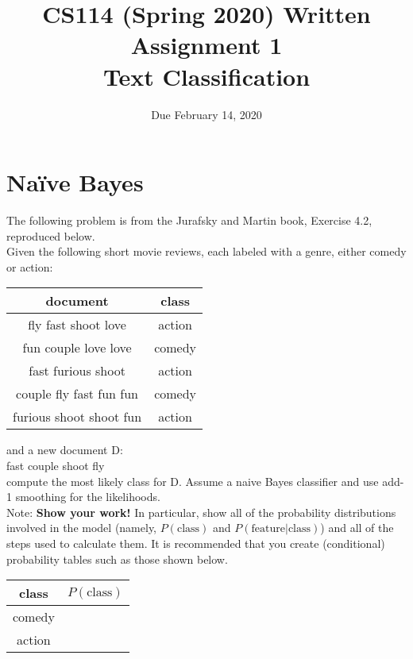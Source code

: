 \documentclass[11pt,letterpaper]{article}
\begin{document}
\title{CS114 (Spring 2020) Written Assignment 1\\Text Classification}
\author{Due February 14, 2020}
\date{}
\maketitle

\section{Na\"ive Bayes}

The following problem is from the Jurafsky and Martin book, Exercise 4.2, reproduced below.\\

\noindent Given the following short movie reviews, each labeled with a genre, either comedy or action:

\begin{center}
\begin{tabular}{|c|c|}
\hline 
document & class \\ 
\hline 
fly fast shoot love & action \\ 
\hline 
fun couple love love & comedy \\ 
\hline 
fast furious shoot & action \\ 
\hline 
couple fly fast fun fun & comedy \\ 
\hline 
furious shoot shoot fun & action \\ 
\hline 
\end{tabular} 
\end{center}

\noindent and a new document D:\\

fast couple shoot fly\\

\noindent compute the most likely class for D. Assume a naive Bayes classifier and use add-1 smoothing for the likelihoods.\\

\noindent Note: \textbf{Show your work!} In particular, show all of the probability distributions involved in the model (namely, $P(\mathrm{class})$ and $P(\mathrm{feature|class})$) and all of the steps used to calculate them. It is recommended that you create (conditional) probability tables such as those shown below.\newpage

\begin{center}
\begin{tabular}{|c|c|}
\hline 
class & $P(\mathrm{class})$ \\ 
\hline 
comedy &  \\ 
\hline 
action &  \\ 
\hline 
\end{tabular} 
\end{center}
\end{document}
